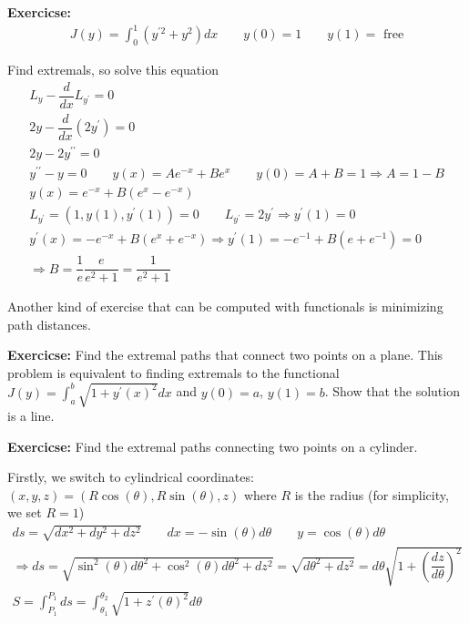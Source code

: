 \par\bigskip
\noindent\textbf{Exercicse:}
\begin{equation*}
  \begin{gathered}
    J(y) = \int_{0}^{1}(y^{\prime2}+y^2)dx\qquad y(0) = 1\qquad y(1) = \text{ free}
  \end{gathered}
\end{equation*}\par
\noindent Find extremals, so solve this equation
\begin{equation*}
  \begin{gathered}
    L_y -\dfrac{d}{dx}L_{y^{\prime}} = 0\\
    2y -\dfrac{d}{dx}(2y^{\prime}) = 0\\
    2y-2y^{\prime\prime}= 0\\
    y^{\prime\prime}-y=0\qquad y(x) = Ae^{-x}+Be^x\qquad y(0) = A+B = 1\Rightarrow A = 1-B\\
    y(x) = e^{-x}+B(e^x-e^{-x})\\
    L_{y^{\prime}} = (1,y(1), y^{\prime}(1)) = 0\qquad L_{y^{\prime}} = 2y^{\prime}\Rightarrow y^{\prime}(1) = 0\\
    y^{\prime}(x) = -e^{-x}+B(e^x+e^{-x})\Rightarrow y^{\prime}(1) = -e^{-1}+B(e+e^{-1}) = 0\\
    \Rightarrow B = \dfrac{1}{e}\dfrac{e}{e^2+1} = \dfrac{1}{e^2+1}
  \end{gathered}
\end{equation*}
\par\bigskip
\noindent Another kind of exercise that can be computed with functionals is minimizing path distances.
\par\bigskip
\noindent\textbf{Exercicse:} Find the extremal paths that connect two points on a plane. This problem is equivalent to finding extremals to the functional $J(y) = \int_{a}^{b}\sqrt{1+y^{\prime}(x)^2}dx$ and $y(0) = a$, $y(1) = b$. Show that the solution is a line.
\par\bigskip
\noindent\textbf{Exercicse:} Find the extremal paths connecting two points on a cylinder.\par
\noindent Firstly, we switch to cylindrical coordinates: $(x,y,z) = (R\cos(\theta), R\sin(\theta), z)$ where $R$ is the radius (for simplicity, we set $R = 1$)
\begin{equation*}
  \begin{gathered}
    ds = \sqrt{dx^2+dy^2+dz^2}\qquad dx = -\sin(\theta)d\theta\qquad y = \cos(\theta)d\theta\\
    \Rightarrow ds = \sqrt{\sin^2(\theta)d\theta^2+\cos^2(\theta)d\theta^2+dz^2} = \sqrt{d\theta^2+dz^2} = d\theta\sqrt{1+\left(\dfrac{dz}{d\theta}\right)^2}\\
    S = \int_{P_1}^{P_1}ds=\int_{\theta_1}^{\theta_2}\sqrt{1+z^{\prime}(\theta)^2}d\theta
  \end{gathered}
\end{equation*}
